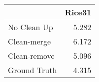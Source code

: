 \begin{tabular}{lr}
\toprule
{} & Rice31 \\
\midrule
No Clean Up  &  5.282 \\
Clean-merge  &  6.172 \\
Clean-remove &  5.096 \\
Ground Truth &  4.315 \\
\bottomrule
\end{tabular}
